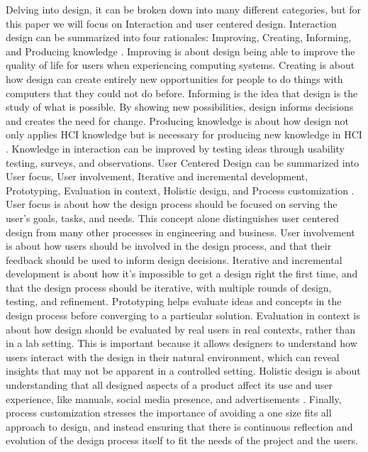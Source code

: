 \documentclass[12pt]{article}
\begin{document}
Delving into design, it can be broken down into many different categories, but for this paper we will focus on Interaction and user centered design. Interaction design can be summarized into four rationales: Improving, Creating, Informing, and Producing knowledge \cite{Hornbæk_Kristensson_Oulasvirta_2025}. Improving is about design being able to improve the quality of life for users when experiencing computing systems. Creating is about how design can create entirely new opportunities for people to do things with computers that they could not do before. Informing is the idea that design is the study of what is possible. By showing new possibilities, design informs decisions and creates the need for change. Producing knowledge is about how design not only applies HCI knowledge but is necessary for producing new knowledge in HCI \cite{Hornbæk_Kristensson_Oulasvirta_2025}. Knowledge in interaction can be improved by testing ideas through usability testing, surveys, and observations. User Centered Design can be summarized into User focus, User involvement, Iterative and incremental development, Prototyping, Evaluation in context, Holistic design, and Process customization \cite{Hornbæk_Kristensson_Oulasvirta_2025}. User focus is about how the design process should be focused on serving the user's goals, tasks, and needs. This concept alone distinguishes user centered design from many other processes in engineering and business. User involvement is about how users should be involved in the design process, and that their feedback should be used to inform design decisions. Iterative and incremental development is about how it's impossible to get a design right the first time, and that the design process should be iterative, with multiple rounds of design, testing, and refinement. Prototyping helps evaluate ideas and concepts in the design process before converging to a particular solution. Evaluation in context is about how design should be evaluated by real users in real contexts, rather than in a lab setting. This is important because it allows designers to understand how users interact with the design in their natural environment, which can reveal insights that may not be apparent in a controlled setting. Holistic design is about understanding that all designed aspects of a product affect its use and user experience, like manuals, social media presence, and advertisements \cite{Hornbæk_Kristensson_Oulasvirta_2025}. Finally, process customization stresses the importance of avoiding a one size fits all approach to design, and instead ensuring that there is continuous reflection and evolution of the design process itself to fit the needs of the project and the users. 
\end{document}
